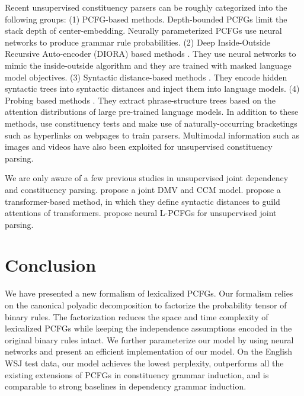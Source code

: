 \documentclass[11pt,a4paper]{article}
\begin{document}
Recent unsupervised constituency parsers can be roughly categorized into the following groups: (1) PCFG-based methods. Depth-bounded PCFGs \cite{jin-etal-2018-depth,jin-etal-2018-unsupervised} limit the stack depth of center-embedding. Neurally parameterized PCFGs \cite{jin-etal-2019-unsupervised, kim-etal-2019-compound, zhu-etal-2020-return, yang-etal-2021-pcfgs} use neural networks to produce grammar rule probabilities. (2) Deep Inside-Outside Recursive Auto-encoder (DIORA) based methods \cite{drozdov-etal-2019-unsupervised-latent, drozdov-etal-2019-unsupervised, drozdov-etal-2020-unsupervised, hong-etal-2020-deep, sahay2021rule}. They use neural networks to mimic the inside-outside algorithm and they are trained with masked language model objectives. (3) Syntactic distance-based methods \cite{DBLP:conf/iclr/ShenLHC18, DBLP:journals/corr/abs-1910-13466,  shen2020structformer}. They encode hidden syntactic trees into syntactic distances and inject them into language models. (4) Probing based methods \cite{DBLP:conf/iclr/KimCEL20, li-etal-2020-heads}.  They extract 
phrase-structure trees based on the attention distributions of large pre-trained language models.
In addition to these methods, \citet{cao-etal-2020-unsupervised-parsing} use constituency tests and \citet{shi-etal-2021-learning} make use of naturally-occurring bracketings such as hyperlinks on webpages to train parsers. Multimodal information such as images \cite{shi-etal-2019-visually, zhao-titov-2020-visually, jin-schuler-2020-grounded} and videos \cite{zhang-etal-2021-video} have also been exploited for unsupervised constituency parsing. 

We are only aware of a few previous studies in unsupervised joint dependency and constituency parsing. \citet{klein-manning-2004-corpus} propose a joint DMV and CCM \cite{klein-manning-2002-generative} model. \citet{shen2020structformer} propose a transformer-based method, in which they define syntactic distances to guild attentions of transformers. \citet{zhu-etal-2020-return} propose neural L-PCFGs for unsupervised joint parsing. 








\section{Conclusion}
We have presented a new formalism of lexicalized PCFGs.
Our formalism relies on the canonical polyadic decomposition to factorize the probability tensor of binary rules.
The factorization reduces the space and time complexity of lexicalized PCFGs while keeping the independence assumptions encoded in the original binary rules intact.
We further parameterize our model by using neural networks and present an efficient implementation of our model.
On the English WSJ test data,
our model achieves the lowest perplexity,
outperforms all the existing extensions of PCFGs in constituency grammar induction,
and is comparable to strong baselines in dependency grammar induction.
\end{document}
